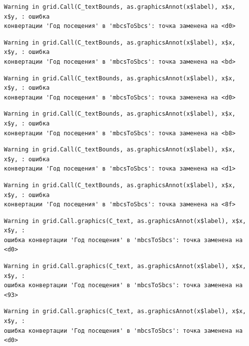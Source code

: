 \documentclass[
  letterpaper,
  DIV=11,
  numbers=noendperiod]{scrreprt}
\begin{document}
\begin{verbatim}
Warning in grid.Call(C_textBounds, as.graphicsAnnot(x$label), x$x, x$y, : ошибка
конвертации 'Год посещения' в 'mbcsToSbcs': точка заменена на <d0>
\end{verbatim}

\begin{verbatim}
Warning in grid.Call(C_textBounds, as.graphicsAnnot(x$label), x$x, x$y, : ошибка
конвертации 'Год посещения' в 'mbcsToSbcs': точка заменена на <bd>
\end{verbatim}

\begin{verbatim}
Warning in grid.Call(C_textBounds, as.graphicsAnnot(x$label), x$x, x$y, : ошибка
конвертации 'Год посещения' в 'mbcsToSbcs': точка заменена на <d0>
\end{verbatim}

\begin{verbatim}
Warning in grid.Call(C_textBounds, as.graphicsAnnot(x$label), x$x, x$y, : ошибка
конвертации 'Год посещения' в 'mbcsToSbcs': точка заменена на <b8>
\end{verbatim}

\begin{verbatim}
Warning in grid.Call(C_textBounds, as.graphicsAnnot(x$label), x$x, x$y, : ошибка
конвертации 'Год посещения' в 'mbcsToSbcs': точка заменена на <d1>
\end{verbatim}

\begin{verbatim}
Warning in grid.Call(C_textBounds, as.graphicsAnnot(x$label), x$x, x$y, : ошибка
конвертации 'Год посещения' в 'mbcsToSbcs': точка заменена на <8f>
\end{verbatim}

\begin{verbatim}
Warning in grid.Call.graphics(C_text, as.graphicsAnnot(x$label), x$x, x$y, :
ошибка конвертации 'Год посещения' в 'mbcsToSbcs': точка заменена на <d0>
\end{verbatim}

\begin{verbatim}
Warning in grid.Call.graphics(C_text, as.graphicsAnnot(x$label), x$x, x$y, :
ошибка конвертации 'Год посещения' в 'mbcsToSbcs': точка заменена на <93>
\end{verbatim}

\begin{verbatim}
Warning in grid.Call.graphics(C_text, as.graphicsAnnot(x$label), x$x, x$y, :
ошибка конвертации 'Год посещения' в 'mbcsToSbcs': точка заменена на <d0>
\end{verbatim}
\end{document}
